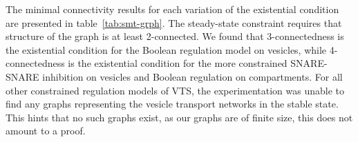


The minimal connectivity results for each variation of the existential condition are presented in table~\ref{tab:smt-grph}.
%
The steady-state constraint requires that structure of the graph is at least 2-connected. 
%
We found that 3-connectedness is the existential condition for the Boolean regulation model on vesicles, while 4-connectedness is the existential condition for the more constrained SNARE-SNARE inhibition on vesicles and Boolean regulation on compartments.
%
For all other constrained regulation models of VTS, the experimentation was unable to find any graphs representing the vesicle transport networks in the stable state.
%
This hints that no such graphs exist, as our graphs are of finite size, this does not amount to a  proof. 



